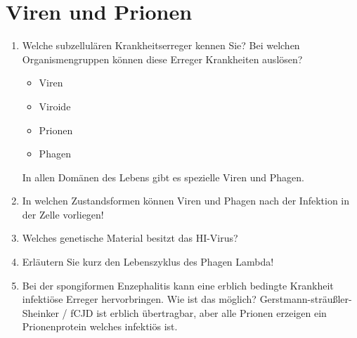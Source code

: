 \section{Viren und Prionen}
\begin{enumerate}
	\item Welche subzellulären Krankheitserreger kennen Sie? Bei welchen Organismengruppen können diese Erreger Krankheiten auslösen?
		
		\begin{itemize}
			\item Viren
			\item Viroide
			\item Prionen
			\item Phagen
		\end{itemize}
		
		In allen Domänen des Lebens gibt es spezielle Viren und Phagen.

	\item In welchen Zustandsformen können Viren und Phagen nach der Infektion in der Zelle vorliegen!
	\item Welches genetische Material besitzt das HI-Virus? 
	\item Erläutern Sie kurz den Lebenszyklus des Phagen Lambda!
	\item Bei der spongiformen Enzephalitis kann eine erblich bedingte Krankheit infektiöse Erreger hervorbringen. Wie ist das möglich?
		Gerstmann-sträußler-Sheinker / fCJD ist erblich übertragbar,
		aber alle Prionen erzeigen ein Prionenprotein welches infektiös ist.

\end{enumerate}
